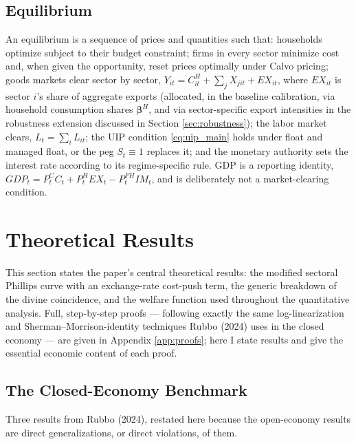 \documentclass[12pt]{article}
\begin{document}
\subsection{Equilibrium}

An equilibrium is a sequence of prices and quantities such that: households optimize subject to their
budget constraint; firms in every sector minimize cost and, when given the opportunity, reset prices
optimally under Calvo pricing; goods markets clear sector by sector,
$Y_{it} = C_{it}^H + \sum_j X_{jit} + EX_{it}$, where $EX_{it}$ is sector $i$'s share of aggregate
exports (allocated, in the baseline calibration, via household consumption shares $\bm\beta^H$, and
via sector-specific export intensities in the robustness extension discussed in Section
\ref{sec:robustness}); the labor market clears, $L_t=\sum_iL_{it}$; the UIP condition
\eqref{eq:uip_main} holds under float and managed float, or the peg $S_t\equiv1$ replaces it; and the
monetary authority sets the interest rate according to its regime-specific rule. GDP is a reporting
identity, $GDP_t = P_t^CC_t + P_t^H EX_t - P_t^{FH}IM_t$, and is deliberately not a market-clearing
condition.

\section{Theoretical Results}
\label{sec:theory}

This section states the paper's central theoretical results: the modified sectoral Phillips curve
with an exchange-rate cost-push term, the generic breakdown of the divine coincidence, and the
welfare function used throughout the quantitative analysis. Full, step-by-step proofs --- following
exactly the same log-linearization and Sherman--Morrison-identity techniques Rubbo (2024) uses in the
closed economy --- are given in Appendix \ref{app:proofs}; here I state results and give the essential
economic content of each proof.

\subsection{The Closed-Economy Benchmark}

Three results from Rubbo (2024), restated here because the open-economy results are direct
generalizations, or direct violations, of them.
\end{document}
